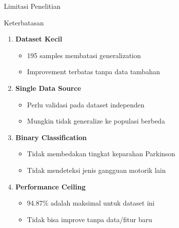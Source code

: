 \documentclass[aspectratio=169]{beamer}
\begin{document}
\begin{frame}{Limitasi Penelitian}
\begin{alertblock}{Keterbatasan}
\begin{enumerate}
    \item \textbf{Dataset Kecil}
    \begin{itemize}
        \item 195 samples membatasi generalization
        \item Improvement terbatas tanpa data tambahan
    \end{itemize}
    
    \item \textbf{Single Data Source}
    \begin{itemize}
        \item Perlu validasi pada dataset independen
        \item Mungkin tidak generalize ke populasi berbeda
    \end{itemize}
    
    \item \textbf{Binary Classification}
    \begin{itemize}
        \item Tidak membedakan tingkat keparahan Parkinson
        \item Tidak mendeteksi jenis gangguan motorik lain
    \end{itemize}
    
    \item \textbf{Performance Ceiling}
    \begin{itemize}
        \item 94.87\% adalah maksimal untuk dataset ini
        \item Tidak bisa improve tanpa data/fitur baru
    \end{itemize}
\end{enumerate}
\end{alertblock}
\end{frame}
\end{document}
